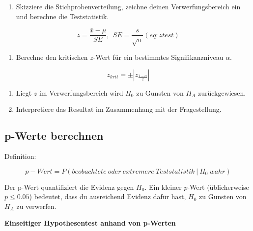\documentclass[
]{book}
\providecommand{\tightlist}{%
  \setlength{\itemsep}{0pt}\setlength{\parskip}{0pt}}
\begin{document}
\begin{enumerate}
\def\labelenumi{\arabic{enumi}.}
\setcounter{enumi}{3}
\tightlist
\item
  Skizziere die Stichprobenverteilung, zeichne deinen Verwerfungsbereich ein und berechne die Teststatistik.
\end{enumerate}

\begin{equation}
  z = \frac{\bar{x} - \mu}{SE}, ~~ SE = \frac{s}{\sqrt{n}}
  (eq:ztest)
\end{equation}

\begin{enumerate}
\def\labelenumi{\arabic{enumi}.}
\setcounter{enumi}{4}
\tightlist
\item
  Berechne den kritischen \(z\)-Wert für ein bestimmtes Signifikanzniveau \(\alpha\).
\end{enumerate}

\begin{equation}
  z_{krit} = \pm |z_{\frac{1-\alpha}{2}}|
  \label{eq:zkrit}
\end{equation}

\begin{enumerate}
\def\labelenumi{\arabic{enumi}.}
\setcounter{enumi}{5}
\tightlist
\item
  Liegt \(z\) im Verwerfungsbereich wird \(H_0\) zu Gunsten von \(H_A\) zurückgewiesen.\\
\item
  Interpretiere das Resultat im Zusammenhang mit der Fragestellung.
\end{enumerate}

\hypertarget{p-werte-berechnen}{%
\subsection{p-Werte berechnen}\label{p-werte-berechnen}}

Definition:

\begin{equation}
  p-Wert = P(beobachtete~oder~extremere~Teststatistik~ | ~H_0~ wahr)
  \label{eq:pvaluedef}
\end{equation}

Der p-Wert quantifiziert die Evidenz gegen \(H_0\). Ein kleiner \(p\)-Wert (üblicherweise \(p \leq 0.05\)) bedeutet, dass du ausreichend Evidenz dafür hast, \(H_0\) zu Gunsten von \(H_A\) zu verwerfen.

\textbf{Einseitiger Hypothesentest anhand von p-Werten}
\end{document}
